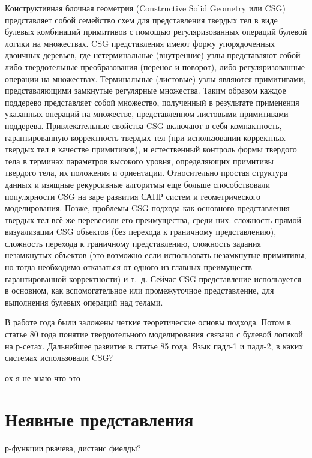 Конструктивная блочная геометрия (Constructive Solid Geometry или CSG) представляет собой семейство схем для представления твердых тел в виде булевых комбинаций примитивов с помощью регуляризованных операций булевой логики на множествах. CSG представления имеют форму упорядоченных двоичных деревьев, где нетерминальные (внутренние) узлы представляют собой либо твердотельные преобразования (перенос и поворот), либо регуляризованные операции на множествах. Терминальные (листовые) узлы являются примитивами, представляющими замкнутые регулярные множества. Таким образом каждое поддерево представляет собой множество, полученный в результате применения указанных операций на множестве, представленном листовыми примитивами поддерева. Привлекательные свойства CSG включают в себя компактность, гарантированную корректность твердых тел (при использовании корректных твердых тел в качестве примитивов), и естественный контроль формы твердого тела в терминах параметров высокого уровня, определяющих примитивы твердого тела, их положения и ориентации. Относительно простая структура данных и изящные рекурсивные алгоритмы еще больше способствовали популярности CSG на заре развития САПР систем и геометрического моделирования. Позже, проблемы CSG подхода как основного представления твердых тел всё же перевесили его преимущества, среди них: сложность прямой визуализации CSG объектов (без перехода к граничному представлению), сложность перехода к граничному представлению, сложность задания незамкнутых объектов (это возможно если использовать незамкнутые примитивы, но тогда необходимо отказаться от одного из главных преимуществ — гарантированной корректности) и т. д. Сейчас CSG представление используется в основном, как вспомогательное или промежуточное представление, для выполнения булевых операций над телами.

В работе \cite{Requicha 77} года были заложены четкие теоретические основы подхода. Потом в статье 80 года понятие твердотельного моделирования связано с булевой логикой на р-сетах. Дальнейшее развитие в статье 85 года. Язык падл-1 и падл-2, в каких системах использовали CSG?

ох я не знаю что это
\cite{Computable Operators on Regular Sets}

\section{Неявные представления} \label{sect_implicit}

р-функции рвачева, дистанс фиелды?

